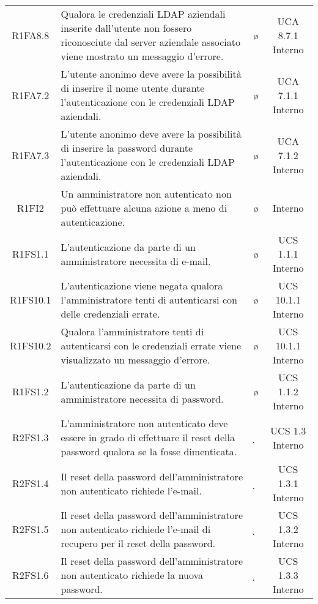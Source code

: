 {\begin{longtable}{ c C{6.5cm} c c}
R1FA8.8 & Qualora le credenziali LDAP aziendali inserite dall'utente non fossero riconosciute dal server aziendale associato viene mostrato un messaggio d'errore. & \o & UCA 8.7.1 Interno \\

R1FA7.2 & L'utente anonimo deve avere la possibilità di inserire il nome utente durante l'autenticazione con le credenziali LDAP aziendali. & \o & UCA 7.1.1 Interno \\

R1FA7.3 & L'utente anonimo deve avere la possibilità di inserire la password durante l'autenticazione con le credenziali LDAP aziendali. & \o & UCA 7.1.2 Interno \\

R1FI2 & Un amministratore non autenticato non può effettuare alcuna azione a meno di autenticazione. & \o & Interno \\

R1FS1.1 & L’autenticazione da parte di un amministratore necessita di e-mail. & \o & UCS 1.1.1 Interno\\

R1FS10.1 & L’autenticazione viene negata qualora l'amministratore tenti di autenticarsi con delle credenziali errate. & \o & UCS 10.1.1 Interno \\

R1FS10.2 & Qualora l'amministratore tenti di autenticarsi con le credenziali errate viene visualizzato un messaggio d’errore. & \o & UCS 10.1.1 Interno \\

R1FS1.2 & L’autenticazione da parte di un amministratore necessita di password. & \o & UCS 1.1.2 Interno\\

R2FS1.3 & L'amministratore non autenticato deve essere in grado di effettuare il reset della password qualora se la fosse dimenticata. & \d & UCS 1.3 Interno\\

R2FS1.4 & Il reset della password dell'amministratore non autenticato richiede l'e-mail. & \d & UCS 1.3.1 Interno \\

R2FS1.5 & Il reset della password dell'amministratore non autenticato richiede l'e-mail di recupero per il reset della password. & \d & UCS 1.3.2 Interno \\

R2FS1.6 & Il reset della password dell'amministratore non autenticato richiede la nuova password. & \d & UCS 1.3.3 Interno \\


\end{longtable}}
